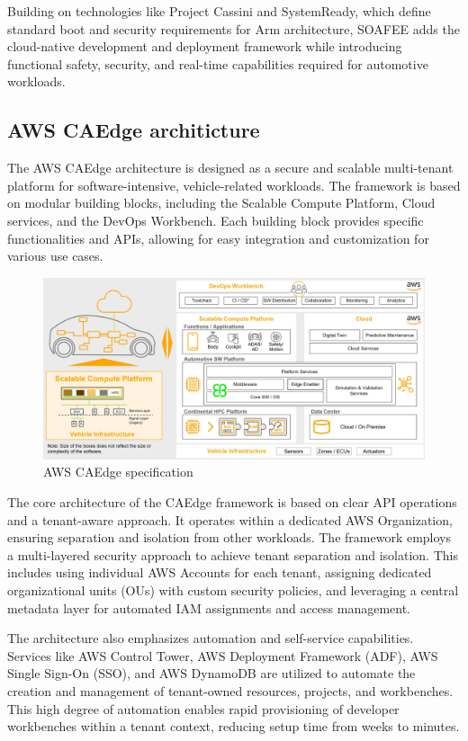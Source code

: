 \documentclass[
12pt,
oneside, 
onehalfspacing, 
nolistspacing, 
parskip, 
chapterinoneline, 
]{AASTCOMPUTER}
\begin{document}
Building on technologies like Project Cassini and SystemReady, which define standard boot and security requirements for Arm architecture, SOAFEE adds the cloud-native development and deployment framework while introducing functional safety, security, and real-time capabilities required for automotive workloads.

\newpage
\subsection{AWS CAEdge architicture}

The AWS CAEdge architecture \cite{AWS_CAedge} is designed as a secure and scalable multi-tenant platform for software-intensive, vehicle-related workloads. The framework is based on modular building blocks, including the Scalable Compute Platform, Cloud services, and the DevOps Workbench. Each building block provides specific functionalities and APIs, allowing for easy integration and customization for various use cases.


\begin{figure}[!ht]
	\centering
	\includegraphics[scale=0.2]{Figures/Architicture/SDV_Cloud.jpg}
  	\caption{AWS CAEdge specification}
  	\label{fig:AWS CAEdge specification}
\end{figure}

The core architecture of the CAEdge framework is based on clear API operations and a tenant-aware approach. It operates within a dedicated AWS Organization, ensuring separation and isolation from other workloads. The framework employs a multi-layered security approach to achieve tenant separation and isolation. This includes using individual AWS Accounts for each tenant, assigning dedicated organizational units (OUs) with custom security policies, and leveraging a central metadata layer for automated IAM assignments and access management.

The architecture also emphasizes automation and self-service capabilities. Services like AWS Control Tower, AWS Deployment Framework (ADF), AWS Single Sign-On (SSO), and AWS DynamoDB are utilized to automate the creation and management of tenant-owned resources, projects, and workbenches. This high degree of automation enables rapid provisioning of developer workbenches within a tenant context, reducing setup time from weeks to minutes.
\end{document}
